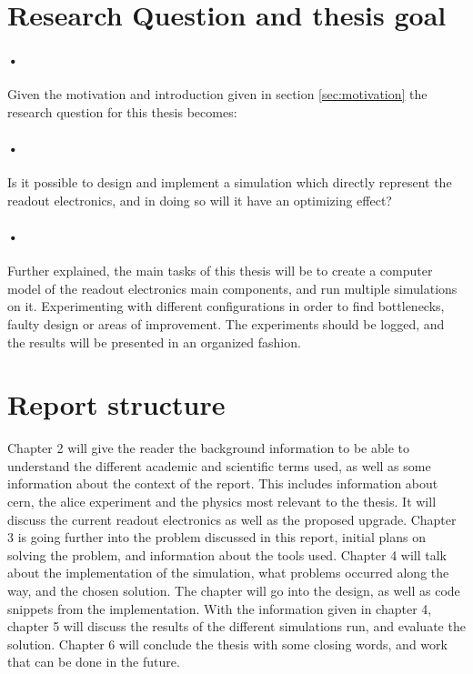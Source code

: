 \documentclass[a4paper]{report}
\begin{document}
\section{Research Question and thesis goal}

\paragraph{•}
Given the motivation and introduction given in section \ref{sec:motivation} the research question for this thesis becomes:

\paragraph{•}
Is it possible to design and implement a simulation which directly represent the readout electronics, and in doing so will it have an optimizing effect?

\paragraph{•}
Further explained, the main tasks of this thesis will be to create a computer model of the readout electronics main components, and run multiple simulations on it.
Experimenting with different configurations in order to find bottlenecks, faulty design or areas of improvement.
The experiments should be logged, and the results will be presented in an organized fashion.


\section{Report structure}
Chapter 2 will give the reader the background information to be able to understand the different academic and scientific terms used, as well as some information about the context of the report.
This includes information about \gls{cern}, the \gls{alice} experiment and the physics most relevant to the thesis.
It will discuss the current readout electronics as well as the proposed upgrade.
Chapter 3 is going further into the problem discussed in this report, initial plans on solving the problem, and information about the tools used.
Chapter 4 will talk about the implementation of the simulation, what problems occurred along the way, and the chosen solution.
The chapter will go into the design, as well as code snippets from the implementation.
With the information given in chapter 4, chapter 5 will discuss the results of the different simulations run, and evaluate the solution.
Chapter 6 will conclude the thesis with some closing words, and work that can be done in the future.
\end{document}
